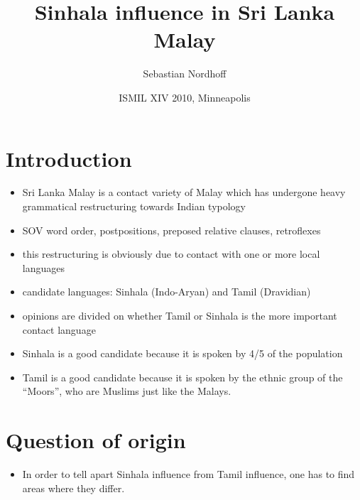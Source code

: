 \documentclass[a4paper,12pt]{article}
\title{Sinhala influence in Sri Lanka Malay}
\author{Sebastian Nordhoff}
\date{ISMIL XIV 2010, Minneapolis}
\begin{document}
\let\eachwordone=\it
\let\eachwordtwo=\rm
\let\eachwordthree=\rm

\maketitle

\section{Introduction}
\begin{itemize}
 \item Sri Lanka Malay is a contact variety of  Malay which has undergone heavy grammatical restructuring towards Indian typology \citep{Smith2003timing, Paauw2004, SmithEtAl2004, SmithEtAl2006cll, Slomanson2006cll, Bakker2006, Ansaldo2008genesis, Nordhoff2009phd}
\item SOV word order, postpositions, preposed relative clauses, retroflexes
\item this restructuring is obviously due to contact with one or more local languages
\item candidate languages: Sinhala (Indo-Aryan) and Tamil (Dravidian)
\item opinions are divided on whether Tamil \citep{Smith2003timing, SmithEtAl2004} or Sinhala \citep{Ansaldo2008genesis} is the more important contact language
\item Sinhala is a good candidate because it is spoken by 4/5 of the population
\item Tamil is a good candidate because it is spoken by the ethnic group of the ``Moors'', who are Muslims just like the Malays.
\end{itemize}


\section{Question of origin}
\begin{itemize}
 \item In order to tell apart Sinhala influence from Tamil influence, one has to find areas where they differ.
\end{itemize}
\end{document}
